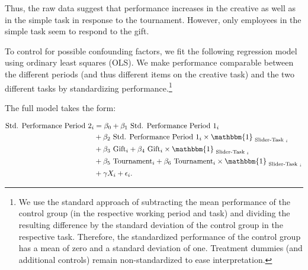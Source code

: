Thus, the raw data suggest that performance increases in the creative 
as well as in the simple task in response to the tournament. However, only 
employees in the simple task seem to respond to the gift. 






To control for possible confounding factors, 
we fit the following
regression model using ordinary least squares (OLS).
We make performance comparable between the different periods (and thus different items on the creative task) and the two different tasks by standardizing performance.\footnote{We use the standard approach of subtracting the mean performance of the control group (in the respective working period and task) and dividing the resulting difference by the standard deviation of the control group in the respective task. Therefore, the standardized performance of the control group has a mean of zero and a standard deviation of one. Treatment dummies (and additional controls) remain non-standardized to ease interpretation.} 






The full model takes the form:

{\small
\begin{equation}\label{eq:reg}
\begin{aligned}
\text{Std. Performance Period 2}_i &= \beta_0 + \beta_1 \text{ Std. Performance Period 1}_i\\
&+ \beta_2 \text{ Std. Performance Period 1}_i \times \mathbbm{1}_{\text{  Slider-Task }_i}\\
&+ \beta_3 \text{ Gift}_i + \beta_4 \text{ Gift}_i \times \mathbbm{1}_{\text{  Slider-Task }_i}\\
&+ \beta_5 \text{ Tournament}_i + \beta_6 \text{ Tournament}_i \times \mathbbm{1}_{\text{  Slider-Task }_i}\\
&+ \gamma X_i + \epsilon_i.
\end{aligned}
\end{equation}}%

